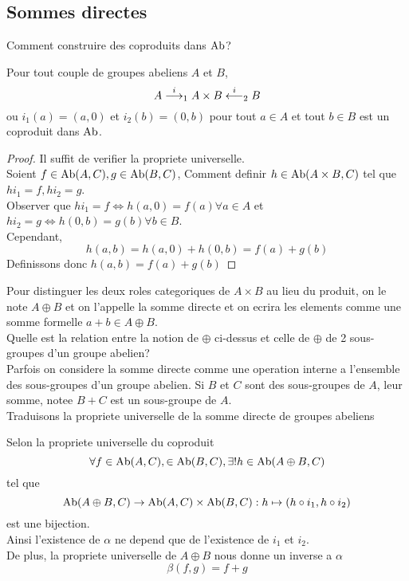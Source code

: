 \documentclass[../main.tex]{subfiles}
\begin{document}
\subsection{Sommes directes}
Comment construire des coproduits dans $\operatorname{Ab}$?
\begin{lemma}
Pour tout couple de groupes abeliens $A$ et $B$,
\[ 
A \overset{i}{\longrightarrow}_1 A\times B \overset{i}{\longleftarrow}_2 B
\]
ou $i_1( a) = ( a,0) $ et $i_2 ( b) = ( 0,b) $ pour tout $a \in A$ et tout $b \in B$ est un coproduit dans $\operatorname{Ab}$.

\end{lemma}
\begin{proof}
Il suffit de verifier la propriete universelle.\\
Soient $f\in \operatorname{Ab}( A,C) , g \in \operatorname{Ab}( B,C) $, Comment definir $h \in \operatorname{Ab}( A\times B, C) $ tel que $hi_1=f, hi_2=g$.\\
Observer que $hi_1 = f \iff h( a,0) = f( a) \forall a \in A$ et $h i_2 = g \iff h( 0,b) = g( b) \forall b \in B$.\\
Cependant,
\[ 
h( a,b) = h( a,0) + h( 0,b) = f( a) + g( b)
\]
Definissons donc $ h( a,b) = f( a) + g( b) $ 

\end{proof}
Pour distinguer les deux roles categoriques de $A\times B$ au lieu du produit, on le note $A\oplus B$ et on l'appelle la somme directe et on ecrira les elements comme une somme formelle $a+ b \in A\oplus B$.\\
Quelle est la relation entre la notion de $\oplus$ ci-dessus et celle de $\oplus$ de 2 sous-groupes d'un groupe abelien?\\
Parfois on considere la somme directe comme une operation interne a l'ensemble des sous-groupes d'un groupe abelien. Si $B$ et $C$ sont des sous-groupes de $A$, leur somme, notee $B+C$ est un sous-groupe de $A$.
\hr\\
Traduisons la propriete universelle de la somme directe de groupes abeliens
\begin{rmq}
Selon la propriete universelle du coproduit
\[ 
\forall f \in \operatorname{Ab}( A,C), \in \operatorname{Ab}( B,C), \exists! h \in \operatorname{Ab}( A\oplus B, C) 
\]
tel que
\[ 
\operatorname{Ab}( A\oplus B, C) \to \operatorname{Ab}( A, C) \times \operatorname{Ab}( B,C) :h \mapsto ( h\circ i_1, h\circ i_2) 
\]
est une bijection.\\
Ainsi l'existence de $\alpha$ ne depend que de l'existence de $i_1$ et $i_2$.\\
De plus, la propriete universelle de $A\oplus B$ nous donne un inverse a $\alpha$ 
\[ 
\beta( f,g) = f+g
\]

\end{rmq}
\end{document}
